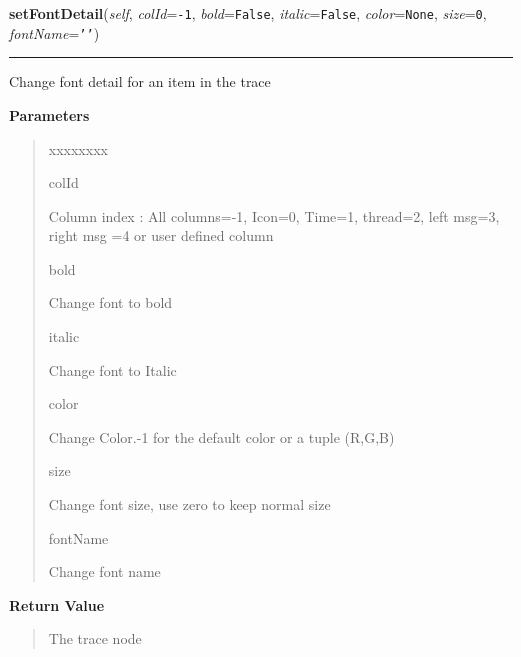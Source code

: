 \hspace{.8\funcindent}\begin{boxedminipage}{\funcwidth}

    \raggedright \textbf{setFontDetail}(\textit{self}, \textit{colId}={\tt -1}, \textit{bold}={\tt False}, \textit{italic}={\tt False}, \textit{color}={\tt None}, \textit{size}={\tt 0}, \textit{fontName}={\tt \texttt{'}\texttt{}\texttt{'}})

    \vspace{-1.5ex}

    \rule{\textwidth}{0.5\fboxrule}
\setlength{\parskip}{2ex}
    Change font detail for an item in the trace

\setlength{\parskip}{1ex}
      \textbf{Parameters}
      \vspace{-1ex}

      \begin{quote}
        \begin{Ventry}{xxxxxxxx}

          \item[colId]

          Column index : All columns=-1, Icon=0, Time=1, thread=2, left 
          msg=3, right msg =4 or user defined column

          \item[bold]

          Change font to bold

          \item[italic]

          Change font to Italic

          \item[color]

          Change Color.-1 for the default color or a tuple (R,G,B)

          \item[size]

          Change font size, use zero to keep normal size

          \item[fontName]

          Change font name

        \end{Ventry}

      \end{quote}

      \textbf{Return Value}
    \vspace{-1ex}

      \begin{quote}
      The trace node

      \end{quote}

    \end{boxedminipage}

